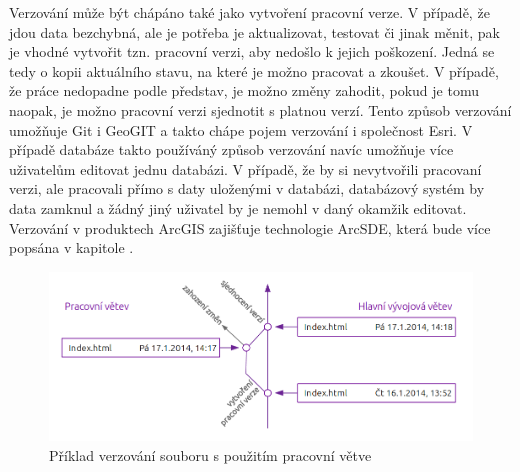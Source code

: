 Verzování může být chápáno také jako vytvoření pracovní verze. V případě, že jdou data bezchybná, ale je potřeba je aktualizovat, testovat či jinak měnit, pak je vhodné vytvořit tzn. pracovní verzi, aby nedošlo k jejich poškození. Jedná se tedy o kopii aktuálního stavu, na které je možno pracovat a zkoušet. V případě, že práce nedopadne podle představ, je možno změny zahodit, pokud je tomu naopak, je možno pracovní verzi sjednotit s platnou verzí. Tento způsob verzování umožňuje Git i Geo\-GIT a takto chápe pojem verzování i společnost Esri. V případě databáze takto používáný způsob verzování navíc umožňuje více uživatelům editovat jednu databázi. V případě, že by si nevytvořili pracovaní verzi, ale pracovali přímo s daty uloženými v databázi, databázový systém by data zamknul a žádný jiný uživatel by je nemohl v daný okamžik editovat. Verzování v produktech ArcGIS zajišťuje technologie ArcSDE, která bude více popsána v kapitole .

          \begin{figure}[H]
            \centering
            \includegraphics[scale=1]{../../../grafy/obr/schema_verzovaniBranch.png}
            \caption {Příklad verzování souboru s použitím pracovní větve}
          \end{figure}

        

